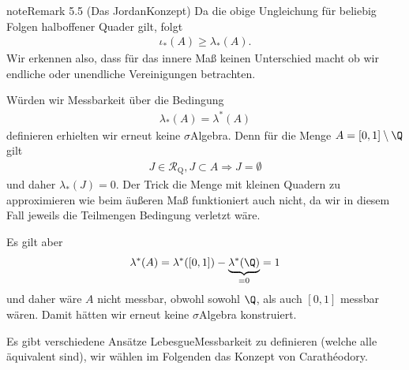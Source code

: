 \documentclass[letterpaper,10pt,english]{jupyterBook}
\begin{document}
\begin{sphinxadmonition}{note}{Remark 5.5 (Das Jordan\sphinxhyphen{}Konzept)}
\sphinxAtStartPar
Da die obige Ungleichung für beliebig Folgen halboffener Quader gilt, folgt
\begin{equation*}
\begin{split}\iota_\ast(A) \geq \lambda_\ast(A).\end{split}
\end{equation*}
\sphinxAtStartPar
Wir erkennen also, dass für das innere Maß keinen Unterschied macht ob wir endliche oder unendliche Vereinigungen betrachten.

\sphinxAtStartPar
Würden wir Messbarkeit über die Bedingung
\begin{equation*}
\begin{split}\lambda_\ast(A)=\lambda^\ast(A)\end{split}
\end{equation*}
\sphinxAtStartPar
definieren erhielten wir erneut keine \(\sigma\)\sphinxhyphen{}Algebra. Denn für die Menge \(A=[0,1]\setminus\Q\) gilt
\begin{equation*}
\begin{split}J\in\mathcal{R}_{\text{Q}}, J\subset A\Rightarrow J=\emptyset\end{split}
\end{equation*}
\sphinxAtStartPar
und daher \(\lambda_\ast(J) = 0\). Der Trick die Menge mit kleinen Quadern zu approximieren wie beim äußeren Maß funktioniert auch nicht, da wir in diesem Fall jeweils die Teilmengen Bedingung verletzt wäre.

\sphinxAtStartPar
Es gilt aber
\begin{equation*}
\begin{split}\lambda^\ast(A) = \lambda^\ast([0,1]) - \underbrace{\lambda^\ast(\Q)}_{=0} = 1\end{split}
\end{equation*}
\sphinxAtStartPar
und daher wäre \(A\) nicht messbar, obwohl sowohl \(\Q\), als auch \([0,1]\) messbar wären. Damit hätten wir erneut keine \(\sigma\)\sphinxhyphen{}Algebra konstruiert.
\end{sphinxadmonition}

\sphinxAtStartPar
Es gibt verschiedene Ansätze Lebesgue\sphinxhyphen{}Messbarkeit zu definieren (welche alle äquivalent sind), wir wählen im Folgenden das Konzept von
Carathéodory.
\end{document}
